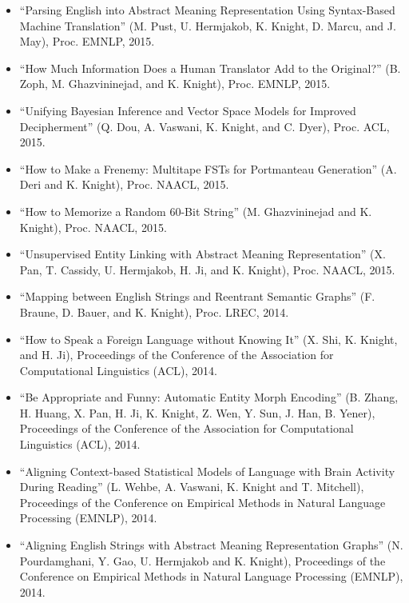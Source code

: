 \begin{itemize}
\item ``Parsing English into Abstract Meaning Representation Using
Syntax-Based Machine Translation''
(M. Pust, U. Hermjakob, K. Knight, D. Marcu, and J. May), Proc. EMNLP, 2015.

\item ``How Much Information Does a Human Translator Add to the Original?''
(B. Zoph, M. Ghazvininejad, and K. Knight), Proc. EMNLP, 2015.

\item ``Unifying Bayesian Inference and Vector Space Models for Improved Decipherment'' (Q. Dou, A. Vaswani, K. Knight, and C. Dyer), Proc. ACL, 2015.

\item ``How to Make a Frenemy: Multitape FSTs for Portmanteau Generation''
(A. Deri and K. Knight), Proc. NAACL, 2015.

\item ``How to Memorize a Random 60-Bit String''
(M. Ghazvininejad and K. Knight), Proc. NAACL, 2015.

\item ``Unsupervised Entity Linking with Abstract Meaning Representation''
(X. Pan, T. Cassidy, U. Hermjakob, H. Ji, and K. Knight), Proc. NAACL, 2015.

\item ``Mapping between English Strings and Reentrant Semantic Graphs'' (F. Braune, D. Bauer, and K. Knight), Proc. LREC, 2014. 

\item ``How to Speak a Foreign Language without Knowing It'' (X. Shi, K. Knight, and H. Ji), 
Proceedings of the Conference of the 
Association for Computational Linguistics (ACL), 2014.

\item ``Be Appropriate and Funny: Automatic Entity Morph Encoding'' (B. Zhang, H. Huang, X. Pan, H. Ji, K. Knight, Z. Wen, Y. Sun, J. Han, B. Yener), 
Proceedings of the Conference of the 
Association for Computational Linguistics (ACL), 2014.

\item ``Aligning Context-based Statistical Models of Language with Brain Activity During Reading'' (L. Wehbe, A. Vaswani, K. Knight and T. Mitchell),
Proceedings of the Conference on Empirical Methods in 
Natural Language Processing (EMNLP), 2014.

\item ``Aligning English Strings with Abstract Meaning Representation Graphs'' (N. Pourdamghani, Y. Gao, U. Hermjakob and K. Knight), 
Proceedings of the Conference on Empirical Methods in 
Natural Language Processing (EMNLP), 2014.


\end{itemize}
